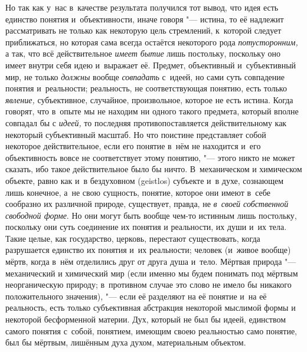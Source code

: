 Но так как у~нас в~качестве результата получился тот вывод,
что идея есть единство понятия и~объективности, иначе говоря
"--- истина, то её надлежит рассматривать не только как
некоторую цель стремлений, к~которой следует приближаться, но которая сама
всегда остаётся некоторого рода
{\em потусторонним,} а
так, что всё действительное {\em имеет
бытие} лишь постольку, поскольку оно имеет внутри себя идею
и~выражает её. Предмет, объективный и~субъективный мир, не только
{\em должны} вообще
{\em совпадать}
с~идеей, но сами суть совпадение понятия и~реальности;
реальность, не соответствующая понятию, есть только
{\em явление,}
субъективное, случайное, произвольное, которое не есть
истина. Когда говорят, что в~опыте мы не находим ни одного такого предмета,
который вполне совпадал бы с
{\em идеей,} то последняя
противопоставляется действительному как некоторый
субъективный масштаб. Но что поистине представляет собой некоторое
действительное, если его понятие в~нём не находится и~его объективность
вовсе не соответствует этому понятию, "--- этого никто не может
сказать, ибо такое действительное было бы ничто. В~механическом и
химическом объекте, равно как и~в бездуховном (geistlos)
субъекте и~в духе, сознающем лишь конечное, а~не свою
сущность, понятие, которое они имеют в~себе сообразно их различной природе,
существует, правда, не {\em в~своей
собственной свободной форме}. Но они могут быть вообще
чем-то истинным лишь постольку, поскольку они суть соединение их понятия и
реальности, их души и~их тела. Такие целые, как государство, церковь,
перестают существовать, когда разрушается единство их понятия и~их
реальности; человек (и~живое вообще) мёртв, когда в~нём отделились друг от
друга душа и~тело. Мёртвая природа "--- механический и
химический мир (если именно мы будем понимать под мёртвым неорганическую
природу; в~противном случае это слово не имело бы никакого положительного
значения), "--- если её разделяют на её понятие и~на её
реальность, есть только субъективная абстракция некоторой мыслимой формы и
некоторой бесформенной материи. Дух, который не был бы идеей, единством
самого понятия с~собой, понятием, имеющим своею реальностью само понятие,
был бы мёртвым, лишённым духа духом, материальным объектом.

